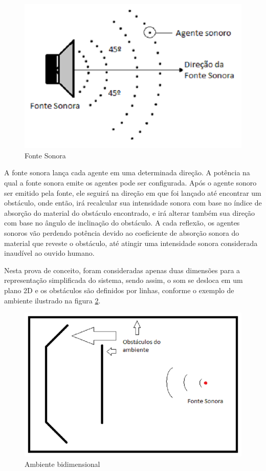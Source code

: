 \FloatBarrier 
\begin{figure}[!htb]
\centering
\includegraphics[scale=0.55]{figuras/fonte_sonora}
\caption{Fonte Sonora}
\label{fonte_sonora}
\end{figure}

A fonte sonora lança cada agente em uma determinada direção. A potência na qual a fonte sonora emite os agentes pode ser configurada. Após o agente sonoro ser emitido pela fonte, ele seguirá na direção em que foi lançado até encontrar um obstáculo, onde então, irá recalcular sua intensidade sonora com base no índice de absorção do material do obstáculo encontrado, e irá alterar também sua direção com base no ângulo de inclinação do obstáculo. A cada reflexão, os agentes sonoros vão perdendo potência devido ao coeficiente de absorção sonora do material que reveste o obstáculo, até atingir uma intensidade sonora considerada inaudível ao ouvido humano.

Nesta prova de conceito, foram consideradas apenas duas dimensões para a representação simplificada do sistema, sendo assim, o som se desloca em um plano 2D e os obstáculos são definidos por linhas, conforme o exemplo de ambiente ilustrado na figura \ref{ambiente}.

\FloatBarrier 
\begin{figure}[!htb]
\centering
\includegraphics[scale=0.55]{figuras/ambiente}
\caption{Ambiente bidimensional}
\label{ambiente}
\end{figure}

